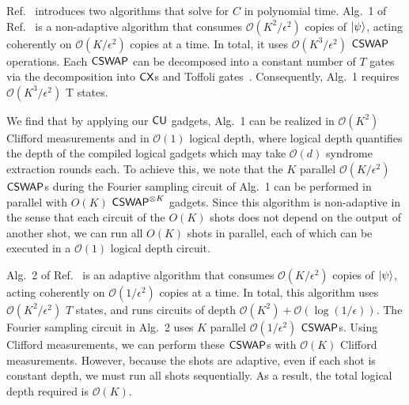 \documentclass[11pt]{article}
\begin{document}
Ref.~\cite{bouland2024statehiddensubgroupproblem} introduces two algorithms that solve for $C$ in polynomial time.
Alg.~1 of Ref.~\cite{bouland2024statehiddensubgroupproblem} is a non-adaptive algorithm that consumes $\mathcal{O}(K^2/\epsilon^2)$ copies of $\ket{\psi}$, acting coherently on $\mathcal{O}(K/\epsilon^2)$ copies at a time.
In total, it uses $\mathcal{O}(K^3/\epsilon^2)$ $\mathsf{CSWAP}$ operations. 
Each $\mathsf{CSWAP}$ can be decomposed into a constant number of $T$ gates via the decomposition into $\mathsf{CX}$s and Toffoli gates~\cite{Jones_2013,nielsen2010quantum}.
Consequently, Alg.~1 requires $\mathcal{O}(K^3/\epsilon^2)$ T states.

We find that by applying our $\mathsf{CU}$ gadgets, Alg.~1 can be realized in $\mathcal{O}(K^2)$ Clifford measurements and in $\mathcal{O}(1)$ logical depth, where logical depth quantifies the depth of the compiled logical gadgets which may take $\mathcal{O}(d)$ syndrome extraction rounds each.
To achieve this, we note that the $K$ parallel $\mathcal{O}(K/\epsilon^2)$ $\mathsf{CSWAP}$s during the Fourier sampling circuit of Alg.~1 can be performed in parallel with $O(K)$ $\mathsf{CSWAP}^{\otimes K}$ gadgets.
Since this algorithm is non-adaptive in the sense that each circuit of the $O(K)$ shots does not depend on the output of another shot, we can run all $O(K)$ shots in parallel, each of which can be executed in a $\mathcal{O}(1)$ logical depth circuit.

Alg.~2 of Ref.~\cite{bouland2024statehiddensubgroupproblem} is an adaptive algorithm that consumes $\mathcal{O}(K/\epsilon^2)$ copies of $\ket{\psi}$, acting coherently on $\mathcal{O}(1/\epsilon^2)$ copies at a time.
In total, this algorithm uses $\mathcal{O}(K^2/\epsilon^2)$ $T$ states, and runs circuits of depth $\mathcal{O}(K^2)+\mathcal{O}(\log(1/\epsilon))$.
The Fourier sampling circuit in Alg.~2 uses $K$ parallel $\mathcal{O}(1/\epsilon^2)$ $\mathsf{CSWAP}$s.
Using Clifford measurements, we can perform these $\mathsf{CSWAP}$s with $\mathcal{O}(K)$ Clifford measurements.
However, because the shots are adaptive, even if each shot is constant depth, we must run all shots sequentially. 
As a result, the total logical depth required is $\mathcal{O}(K)$.



\ifdefined\ismainfile
\else
    
    
\end{document}
